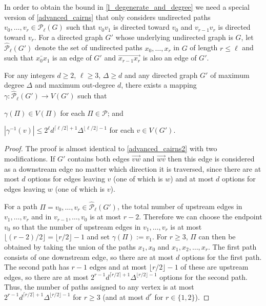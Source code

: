 \documentclass{patmorin}
\begin{document}
In order to obtain the bound in \cref{l_degenerate_and_degree} we need a special version of \cref{advanced_cairns} that only considers undirected paths $v_0,\ldots,v_r\in \mathcal{P}_\ell(G)$ such that $v_0v_1$ is directed toward $v_0$ and $v_{r-1}v_r$ is directed toward $v_r$.  For a directed graph $G'$ whose underlying undirected graph is $G$, let $\widehat{\mathcal{P}}_\ell(G')$ denote the set of undirected paths $x_0,\ldots,x_r$ in $G$ of length $r\le\ell$ and such that $\overleftarrow{x_0x_1}$ is an edge of $G'$ and $\overrightarrow{x_{r-1}x_{r}}$ is also an edge of $G'$.

\begin{lem}\label{advanced_cairns2}
  For any integers $d\ge 2$, $\ell\ge 3$, $\Delta\ge d$ and any
  directed graph $G'$ of maximum degree $\Delta$ and maximum out-degree $d$, there exists a mapping $\gamma:\widehat{\mathcal{P}}_\ell(G')\to V(G')$ such that
  \begin{compactenum}[(i)]
    \item $\gamma(\Pi)\in V(\Pi)$ for each $\Pi\in\mathcal{P}$; and
    \item $|\gamma^{-1}(v)| \le 2^{\ell}d^{\lceil \ell/2\rceil+1}\Delta^{\lfloor\ell/2\rfloor-1}$ for each $v\in V(G')$.
  \end{compactenum}
\end{lem}

\begin{proof}
  The proof is almost identical to \cref{advanced_cairns2} with two modifications.  If $G'$ contains both edges $\overrightarrow{vw}$ and $\overrightarrow{wv}$ then this edge is considered as a downstream edge no matter which direction it is traversed, since there are at most $d$ options for edges leaving $v$ (one of which is $w$) and at most $d$ options for edges leaving $w$ (one of which is $v$).

  For a path $\Pi=v_0,\ldots,v_r\in\widehat{\mathcal{P}}_\ell(G')$, the total number of upstream edges in $v_1,\ldots,v_r$ and in $v_{r-1},\ldots,v_0$ is at most $r-2$.  Therefore we can choose the endpoint $v_0$ so that the number of upstream edges in $v_1,\ldots,v_r$ is at most $\lfloor (r-2)/2\rfloor=\lfloor r/2\rfloor-1$ and set $\gamma(\Pi):=v_1$. For $r\ge 3$, $\Pi$ can then be obtained by taking the union of the paths $x_1,x_0$ and $x_1,x_2,\ldots,x_r$.  The first path consists of one downstream edge, so there are at most $d$ options for the first path.  The second path has $r-1$ edges and at most $\lfloor r/2\rfloor-1$ of these are upstream edges, so there are at most $2^{r-1}d^{\lceil r/2\rceil+1}\Delta^{\lfloor r/2\rfloor-1}$ options for the second path.
   Thus, the number of paths assigned to any vertex is at most $2^{r-1}d^{\lceil r/2\rceil+1}\Delta^{\lfloor r/2\rfloor-1}$ for $r\ge 3$ (and at most $d^r$ for $r\in\{1,2\}$).
\end{proof}
\end{document}
